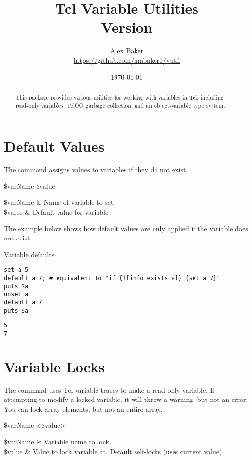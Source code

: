 \documentclass{article}
\title{\Huge Tcl Variable Utilities\\\small Version \version}
\author{Alex Baker\\\small\url{https://github.com/ambaker1/vutil}}
\date{\small\today}
\begin{document}
\maketitle
\begin{abstract}
\begin{center}
This package provides various utilities for working with variables in Tcl, including read-only variables, TclOO garbage collection, and an object-variable type system.
\end{center}
\end{abstract}

\clearpage
\section{Default Values}
The command  assigns values to variables if they do not exist.
\begin{syntax}
 \$varName \$value
\end{syntax}
\begin{args}
\$varName & Name of variable to set \\
\$value & Default value for variable
\end{args}

The example below shows how default values are only applied if the variable does not exist.
\begin{example}{Variable defaults}
\begin{lstlisting}
set a 5
default a 7; # equivalent to "if {![info exists a]} {set a 7}"
puts $a
unset a
default a 7
puts $a
\end{lstlisting}
\tcblower
\begin{lstlisting}
5
7
\end{lstlisting}
\end{example}
\clearpage
\section{Variable Locks}
The command  uses Tcl variable traces to make a read-only variable. 
If attempting to modify a locked variable, it will throw a warning, but not an error.
You can lock array elements, but not an entire array.

\begin{syntax}
 \$varName <\$value>
\end{syntax}
\begin{args}
\$varName & Variable name to lock.  \\
\$value & Value to lock variable at. Default self-locks (uses current value).
\end{args}
\end{document}
